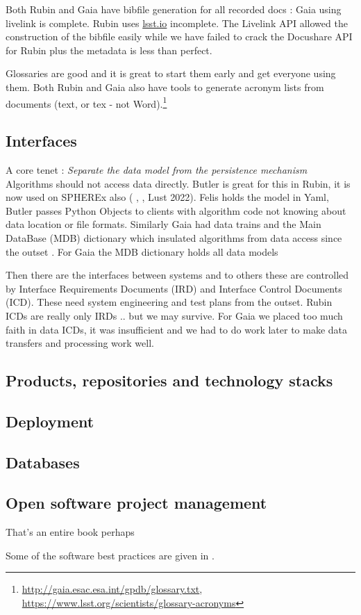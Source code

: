 \documentclass[11pt,twoside]{article}
\begin{document}
Both Rubin and Gaia have  bibfile generation for all recorded docs : Gaia using   livelink is  complete. Rubin uses \url{lsst.io} incomplete.
The Livelink API allowed the construction of the bibfile easily while we have failed to crack the Docushare API for Rubin plus the metadata is less than perfect.

Glossaries are good and it is great to start them early and get everyone using them.
Both Rubin and Gaia also have tools to generate acronym lists from documents (text, or tex - not Word).\footnote{\url{http://gaia.esac.esa.int/gpdb/glossary.txt}, \url{https://www.lsst.org/scientists/glossary-acronyms}}


\subsection{Interfaces}
A core tenet : \emph{Separate the data model from the persistence mechanism}
Algorithms should not access data directly.
Butler is great for this in Rubin, it is  now used on SPHEREx also (\cite{2022SPIE12189E..11J} , \cite{2019ASPC..523..653J}, Lust 2022).
Felis holds the model in Yaml, Butler passes Python Objects to clients with algorithm code not knowing about data location or file formats.
Similarly Gaia had data trains and the Main DataBase (MDB) dictionary which insulated algorithms from data access since the outset \citep{1999BaltA...8...57O}.
For Gaia the MDB dictionary holds all data models  \citep{2015ASPC..495...47H, 2011ASPC..442..351O}


Then there are the interfaces between systems and to others these are controlled by Interface Requirements Documents (IRD) and Interface Control Documents (ICD).
These need system engineering and test plans from the outset.
Rubin ICDs are really only IRDs .. but we may survive.
For Gaia  we placed too much faith in data ICDs, it was insufficient and we had to do work later to make data transfers and processing work well.



\subsection{Products, repositories and technology stacks}
\subsection{Deployment}
\subsection{Databases}
\subsection{Open software project management}
That's an entire book perhaps

Some of the software best practices are given in \citet{2018SPIE10707E..09J}.


\end{document}
